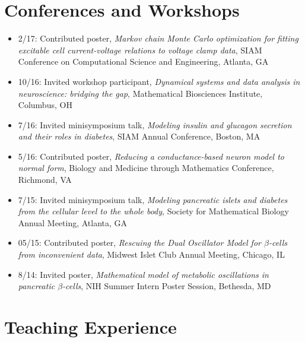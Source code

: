 \documentclass[11pt]{cv}
\begin{document}
\section*{Conferences and Workshops}
\label{sec:orgheadline11}
\begin{itemize}
\item 2/17: Contributed poster, \emph{Markov chain Monte Carlo optimization for fitting excitable cell current-voltage relations to voltage clamp data}, SIAM Conference on Computational Science and Engineering, Atlanta, GA\\
\item 10/16: Invited workshop participant, \emph{Dynamical systems and data analysis in neuroscience: bridging the gap}, Mathematical Biosciences Institute, Columbus, OH\\
\item 7/16: Invited minisymposium talk, \emph{Modeling insulin and glucagon secretion and their roles in diabetes}, SIAM Annual Conference, Boston, MA\\
\item 5/16: Contributed poster, \emph{Reducing a conductance-based neuron model to normal form}, Biology and Medicine through Mathematics Conference, Richmond, VA\\
\item 7/15: Invited minisymposium talk, \emph{Modeling pancreatic islets and diabetes from the cellular level to the whole body}, Society for Mathematical Biology Annual Meeting, Atlanta, GA\\
\item 05/15: Contributed poster, \emph{Rescuing the Dual Oscillator Model for \(\beta\)-cells from inconvenient data}, Midwest Islet Club Annual Meeting, Chicago, IL\\
\item 8/14: Invited poster, \emph{Mathematical model of metabolic oscillations in pancreatic \(\beta\)-cells}, NIH Summer Intern Poster Session, Bethesda, MD\\
\end{itemize}
\section*{Teaching Experience}
\label{sec:orgheadline16}
\end{document}
